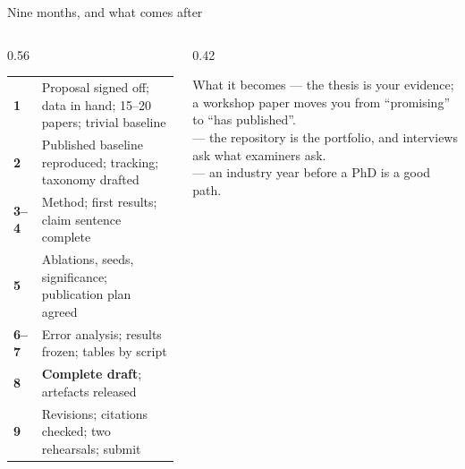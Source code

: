 \documentclass[aspectratio=169,11pt]{beamer}
\begin{document}
\begin{frame}{Nine months, and what comes after}
\begin{columns}[T]
\begin{column}{0.56\textwidth}
\scriptsize
\begin{tabularx}{\linewidth}{>{\raggedright\arraybackslash}p{1.2cm} X}
\toprule
\rowcolor{rowtint} \textbf{1} & Proposal signed off; data in hand; 15--20 papers; trivial baseline \\
\textbf{2} & Published baseline reproduced; tracking; taxonomy drafted \\
\rowcolor{rowtint} \textbf{3--4} & Method; first results; claim sentence complete \\
\textbf{5} & Ablations, seeds, significance; publication plan agreed \\
\rowcolor{rowtint} \textbf{6--7} & Error analysis; results frozen; tables by script \\
\textbf{8} & \textbf{Complete draft}; artefacts released \\
\rowcolor{rowtint} \textbf{9} & Revisions; citations checked; two rehearsals; submit \\
\bottomrule
\end{tabularx}
\end{column}
\begin{column}{0.42\textwidth}
\begin{block}{What it becomes}
\footnotesize
{} --- the thesis is your evidence; a workshop paper moves
you from ``promising'' to ``has published''.\\[3pt]
 --- the repository is the portfolio, and interviews ask what
examiners ask.\\[3pt]
 --- an industry year before a PhD is a good path.
\end{block}
\end{column}
\end{columns}
\end{frame}
\end{document}
